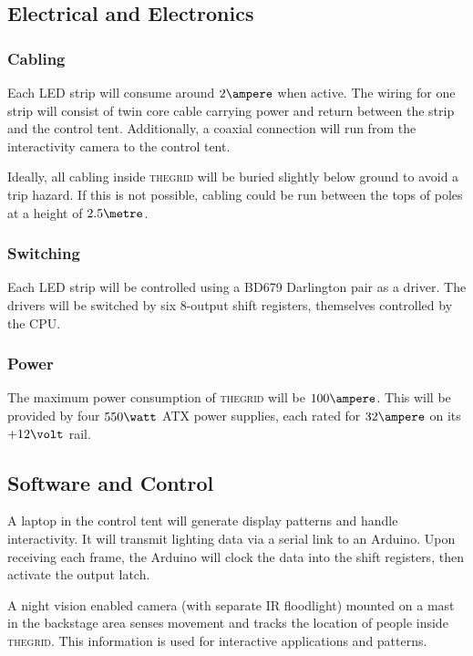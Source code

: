 \documentclass[12pt]{article} %
\newcommand{\thegrid}{\textsc{the\textperiodcentered grid}\xspace}
\begin{document}
\subsection{Electrical and Electronics}
\subsubsection{Cabling}
Each LED strip will consume around $2\ampere$ when active.  The wiring for one
strip will consist of twin core cable carrying power and return between the
strip and the control tent.  Additionally, a coaxial connection will run from
the interactivity camera to the control tent.

Ideally, all cabling inside \thegrid will be buried slightly below ground to
avoid a trip hazard.  If this is not possible, cabling could be run between the
tops of poles at a height of $2.5\metre$.

\subsubsection{Switching}
Each LED strip will be controlled using a BD679
Darlington pair as a driver.  The drivers will be switched by six 8-output
shift registers, themselves controlled by the CPU.

\subsubsection{Power}
The maximum power consumption of \thegrid will be
$100\ampere$.  This will be provided by four $550\watt$ ATX power supplies,
each rated for $32\ampere$ on its $+12\volt$ rail.

\subsection{Software and Control}
A laptop in the control tent will generate
display patterns and handle interactivity.  It will transmit lighting data via
a serial link to an Arduino.  Upon receiving each frame, the Arduino will clock
the data into the shift registers, then activate the output latch.

A night vision enabled camera (with separate IR floodlight) mounted on a mast
in the backstage area senses movement and tracks the location of people inside
\thegrid.  This information is used for interactive applications and patterns.

\end{document}
